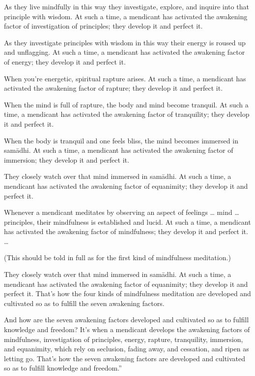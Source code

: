 \documentclass[12pt,openany]{book}%
\begin{document}
As they live mindfully in this way they investigate, explore, and inquire into that principle with wisdom. At such a time, a mendicant has activated the awakening factor of investigation of principles; they develop it and perfect it. 

As they investigate principles with wisdom in this way their energy is roused up and unflagging. At such a time, a mendicant has activated the awakening factor of energy; they develop it and perfect it. 

When you’re energetic, spiritual rapture arises. At such a time, a mendicant has activated the awakening factor of rapture; they develop it and perfect it. 

When the mind is full of rapture, the body and mind become tranquil. At such a time, a mendicant has activated the awakening factor of tranquility; they develop it and perfect it. 

When the body is tranquil and one feels bliss, the mind becomes immersed in \textsanskrit{samādhi}. At such a time, a mendicant has activated the awakening factor of immersion; they develop it and perfect it. 

They closely watch over that mind immersed in \textsanskrit{samādhi}. At such a time, a mendicant has activated the awakening factor of equanimity; they develop it and perfect it. 

Whenever a mendicant meditates by observing an aspect of feelings … mind … principles, their mindfulness is established and lucid. At such a time, a mendicant has activated the awakening factor of mindfulness; they develop it and perfect it. … 

(This should be told in full as for the first kind of mindfulness meditation.) 

They closely watch over that mind immersed in \textsanskrit{samādhi}. At such a time, a mendicant has activated the awakening factor of equanimity; they develop it and perfect it. That’s how the four kinds of mindfulness meditation are developed and cultivated so as to fulfill the seven awakening factors. 

And how are the seven awakening factors developed and cultivated so as to fulfill knowledge and freedom? It’s when a mendicant develops the awakening factors of mindfulness, investigation of principles, energy, rapture, tranquility, immersion, and equanimity, which rely on seclusion, fading away, and cessation, and ripen as letting go. That’s how the seven awakening factors are developed and cultivated so as to fulfill knowledge and freedom.” 
\end{document}
